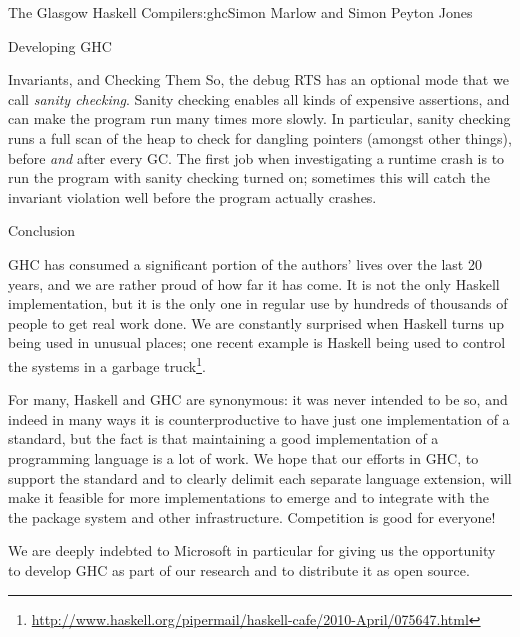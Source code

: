 \begin{aosachapter}{The Glasgow Haskell Compiler}{s:ghc}{Simon Marlow and Simon Peyton Jones}
\begin{aosasect1}{Developing GHC}
\begin{aosasect2}{Invariants, and Checking Them}
So, the debug RTS has an optional mode that we call \emph{sanity
  checking}.  Sanity checking enables all kinds of expensive
assertions, and can make the program run many times more slowly.  In
particular, sanity checking runs a full scan of the heap to check for
dangling pointers (amongst other things), before \emph{and} after
every GC.  The first job when investigating a runtime crash is to run
the program with sanity checking turned on; sometimes this will catch
the invariant violation well before the program actually crashes.

\end{aosasect2}

\end{aosasect1}

\begin{aosasect1}{Conclusion}

GHC has consumed a significant portion of the authors' lives over the
last 20 years, and we are rather proud of how far it has come.  It is
not the only Haskell implementation, but it is the only one in regular
use by hundreds of thousands of people to get real work done.  We are
constantly surprised when Haskell turns up being used in unusual
places; one recent example is Haskell being used to control the
systems in a garbage
truck\footnote{\url{http://www.haskell.org/pipermail/haskell-cafe/2010-April/075647.html}}.

For many, Haskell and GHC are synonymous: it was never intended to be
so, and indeed in many ways it is counterproductive to have just one
implementation of a standard, but the fact is that maintaining a good
implementation of a programming language is a lot of work.  We hope
that our efforts in GHC, to support the standard and to clearly delimit
each separate language extension, will make it feasible for more
implementations to emerge and to integrate with the the package system
and other infrastructure.  Competition is good for everyone!

We are deeply indebted to Microsoft in particular for giving us the
opportunity to develop GHC as part of our research and to distribute
it as open source.

\end{aosasect1}

\end{aosachapter}
